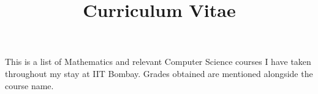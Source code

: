 \documentclass[a4paper,12pt,english]{curve}
\title{Curriculum Vitae}
\begin{document}
\makeheaders[c]

This is a list of Mathematics and relevant Computer Science courses I have taken throughout my stay at IIT Bombay. Grades obtained are mentioned alongside the course name.

\end{document}
